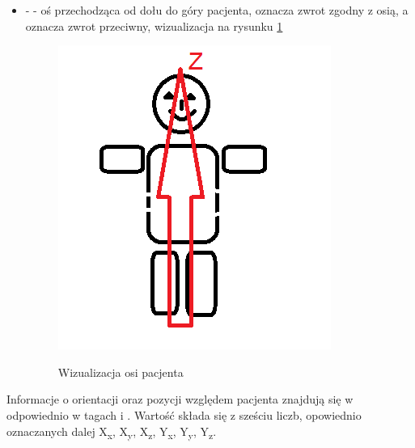 \begin{itemize}
\begin{itemize}
        \item {} -  - oś przechodząca od dołu do góry pacjenta,  oznacza zwrot zgodny z osią, a  oznacza zwrot przeciwny, wizualizacja na rysunku \ref{fig:imageorientationindicator4}

        \begin{figure}[h]
            \caption{Wizualizacja osi  pacjenta}
            \includegraphics[]{img/imageorientationindicator-103.png}
            \centering
            \label{fig:imageorientationindicator4}
        \end{figure}

    \end{itemize}

    Informacje o orientacji oraz pozycji względem pacjenta znajdują się w odpowiednio w tagach  i .
    Wartość  składa się z sześciu liczb, opowiednio oznaczanych dalej X\textsubscript{x}, X\textsubscript{y}, X\textsubscript{z}, Y\textsubscript{x}, Y\textsubscript{y}, Y\textsubscript{z}.


\end{itemize}
